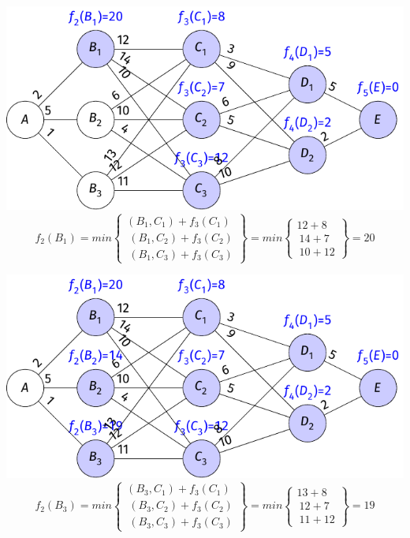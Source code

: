 \begin{frame}
    \includegraphics{fig/4-2-7.pdf}
    $$f_2(B_1)=min \begin{Bmatrix}(B_1,C_1)+f_3(C_1)\\\ (B_1,C_2)+f_3(C_2)\\\ (B_1,C_3)+f_3(C_3) \end{Bmatrix} =min \begin{Bmatrix}12+8\\\ 14+7\\\ 10+12 \end{Bmatrix} =20$$
\end{frame}
\begin{frame}
    \includegraphics{fig/4-2-8.pdf}
    $$f_2(B_3)=min \begin{Bmatrix}(B_3,C_1)+f_3(C_1)\\\ (B_3,C_2)+f_3(C_2)\\\ (B_3,C_3)+f_3(C_3) \end{Bmatrix} =min \begin{Bmatrix}13+8\\\ 12+7\\\ 11+12 \end{Bmatrix} =19$$
\end{frame}
